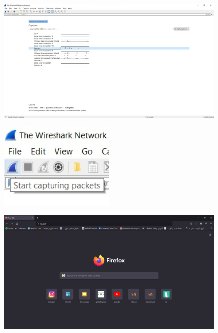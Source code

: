 \documentclass{article}
\begin{document}
\begin{figure}[H]
    \centering
    \includegraphics[width=1.0\textwidth]{figures/4.jpg}
    \caption{}
    \label{fig:fig1}
\end{figure}

\begin{figure}[H]
    \centering
    \includegraphics[width=0.5\textwidth]{figures/5.jpg}
    \caption{}
    \label{fig:fig1}
\end{figure}

\begin{figure}[H]
    \centering
    \includegraphics[width=1.0\textwidth]{figures/6.jpg}
    \caption{}
    \label{fig:fig1}
\end{figure}
\end{document}

